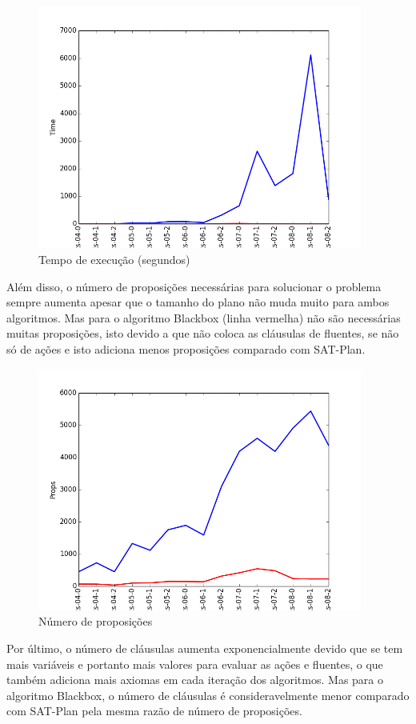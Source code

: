 		\begin{figure}[H]
			\centering
			\includegraphics[height=8cm]{images/blocks_time}
			\caption{Tempo de execução (segundos)}
			\label{fig:blockstime}
		\end{figure}
	Além disso, o número de proposições necessárias para solucionar o problema sempre aumenta apesar que o tamanho do plano não muda muito para ambos algoritmos. Mas para o algoritmo Blackbox (linha vermelha) não são necessárias muitas proposições, isto devido a que não coloca as cláusulas de fluentes, se não só de ações e isto adiciona menos proposições comparado com SAT-Plan.
		\begin{figure}[H]
			\centering
			\includegraphics[height=8cm]{images/blocks_props}
			\caption{Número de proposições}
			\label{fig:blocksprops}
		\end{figure}
	Por último, o número de cláusulas aumenta exponencialmente devido que se tem mais variáveis e portanto mais valores para evaluar as ações e fluentes, o que também adiciona mais axiomas em cada iteração dos algoritmos. Mas para o algoritmo Blackbox, o número de cláusulas é consideravelmente menor comparado com SAT-Plan pela mesma razão de número de proposições.
